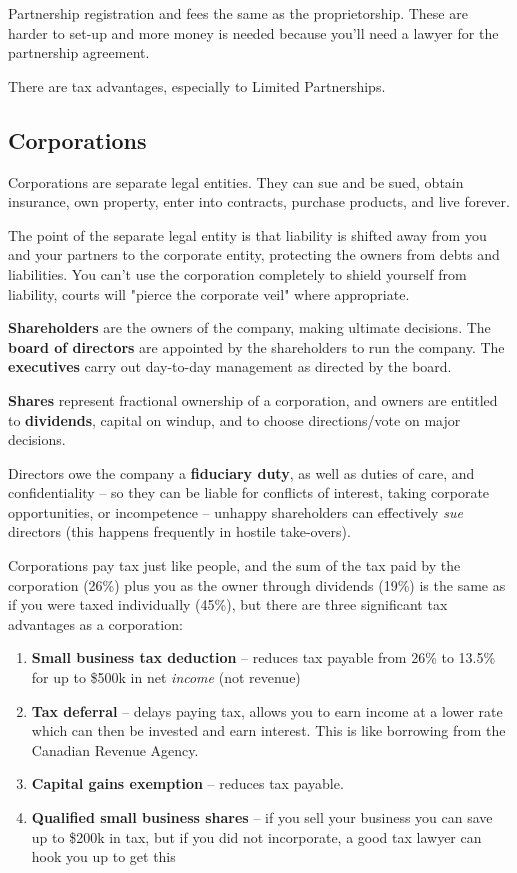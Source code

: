 \documentclass{article}
\begin{document}
Partnership registration and fees the same as the proprietorship. These are harder to set-up and more money is needed because you'll need a lawyer for the partnership agreement.

There are tax advantages, especially to Limited Partnerships.

\subsection{Corporations}

Corporations are separate legal entities. They can sue and be sued, obtain insurance, own property, enter into contracts, purchase products, and live forever.

The point of the separate legal entity is that liability is shifted away from you and your partners to the corporate entity, protecting the owners from debts and liabilities. You can't use the corporation completely to shield yourself from liability, courts will "pierce the corporate veil" where appropriate.


\textbf{Shareholders} are the owners of the company, making ultimate decisions. The \textbf{board of directors} are appointed by the shareholders to run the company. The \textbf{executives} carry out day-to-day management as directed by the board. 

\textbf{Shares} represent fractional ownership of a corporation, and owners are entitled to \textbf{dividends}, capital on windup, and to choose directions/vote on major decisions.

Directors owe the company a \textbf{fiduciary duty}, as well as duties of care, and confidentiality -- so they can be liable for conflicts of interest, taking corporate opportunities, or incompetence -- unhappy shareholders can effectively \textit{sue} directors (this happens frequently in hostile take-overs).

Corporations pay tax just like people, and the sum of the tax paid by the corporation (26\%) plus you as the owner through dividends (19\%) is the same as if you were taxed individually (45\%), but there are three significant tax advantages as a corporation: \begin{enumerate}
\item \textbf{Small business tax deduction} -- reduces tax payable from 26\% to 13.5\% for up to \$500k in net \textit{income} (not revenue)
\item \textbf{Tax deferral} -- delays paying tax, allows you to earn income at a lower rate which can then be invested and earn interest. This is like borrowing from the Canadian Revenue Agency. 
\item \textbf{Capital gains exemption} -- reduces tax payable. 
\item \textbf{Qualified small business shares} -- if you sell your business you can save up to \$200k in tax, but if you did not incorporate, a good tax lawyer can hook you up to get this
\end{enumerate}
\end{document}
